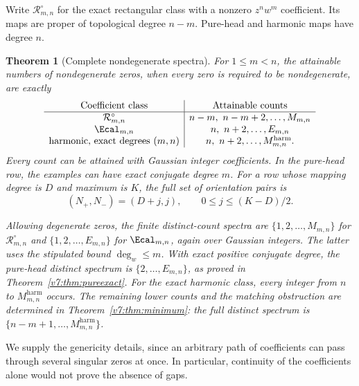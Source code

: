 \documentclass[UTF8,11pt]{ctexart}
\newtheorem{thm}{Theorem}[section]
\theoremstyle{definition}
\numberwithin{equation}{section}
\begin{document}
Write $\mathcal R_{m,n}^{\circ}$ for the exact rectangular class with
a nonzero $z^nw^m$ coefficient. Its maps are proper of topological
degree $n-m$. Pure-head and harmonic maps have degree $n$.

\begin{thm}[Complete nondegenerate spectra]\label{v6:thm:spectra}
For $1\le m<n$, the attainable numbers of nondegenerate zeros, when
every zero is required to be nondegenerate, are exactly
\begin{equation}\label{v6:eq:spectra}
\begin{array}{c|c}
\text{Coefficient class}&\text{Attainable counts}\\ \hline
\mathcal R_{m,n}^{\circ}&n-m,\ n-m+2,\ldots,M_{m,n}\\
\Ecal_{m,n}&n,\ n+2,\ldots,E_{m,n}\\
\text{harmonic, exact degrees }(m,n)&n,\ n+2,\ldots,M^{\mathrm{harm}}_{m,n}.
\end{array}
\end{equation}
Every count can be attained with Gaussian integer coefficients.
In the pure-head row, the examples can have exact conjugate degree $m$.
For a row whose mapping degree is $D$ and maximum is $K$, the full
set of orientation pairs is
\begin{equation}\label{v6:eq:signspectrum}
 (N_+,N_-)=(D+j,j),\qquad 0\le j\le(K-D)/2.
\end{equation}

Allowing degenerate zeros, the \emph{finite distinct-count} spectra
are $\{1,2,\ldots,M_{m,n}\}$ for $\mathcal R_{m,n}^{\circ}$ and
$\{1,2,\ldots,E_{m,n}\}$ for $\Ecal_{m,n}$, again over Gaussian
integers. The latter uses the stipulated bound $\deg_w\le m$.
With exact positive conjugate degree, the pure-head distinct spectrum
is $\{2,\ldots,E_{m,n}\}$, as proved in Theorem~\ref{v7:thm:pureexact}.
For the exact harmonic class, every integer from $n$ to
$M^{\mathrm{harm}}_{m,n}$ occurs. The remaining lower counts and
the matching obstruction are determined in
Theorem~\ref{v7:thm:minimum}: the full distinct spectrum is
$\{n-m+1,\ldots,M^{\mathrm{harm}}_{m,n}\}$.
\end{thm}

We supply the genericity details, since an arbitrary path of
coefficients can pass through several singular zeros at once.
In particular, continuity of the coefficients alone would not prove
the absence of gaps.
\end{document}
